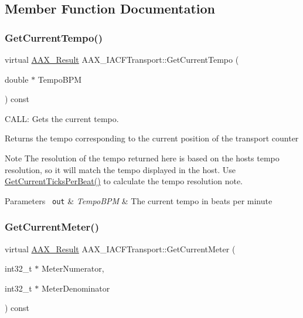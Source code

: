 \subsection{Member Function Documentation}
\mbox{\label{a01757_ac0818801e66a6840216ac3657d7abcf1}} 
\subsubsection{\texorpdfstring{GetCurrentTempo()}{GetCurrentTempo()}}
{\footnotesize\ttfamily virtual \mbox{\hyperlink{a00392_a4d8f69a697df7f70c3a8e9b8ee130d2f}{A\+A\+X\+\_\+\+Result}} A\+A\+X\+\_\+\+I\+A\+C\+F\+Transport\+::\+Get\+Current\+Tempo (\begin{DoxyParamCaption}\item[{double $\ast$}]{Tempo\+B\+PM }\end{DoxyParamCaption}) const\hspace{0.3cm}{\ttfamily [pure virtual]}}



C\+A\+LL\+: Gets the current tempo. 

Returns the tempo corresponding to the current position of the transport counter

\begin{DoxyNote}{Note}
The resolution of the tempo returned here is based on the host\textquotesingle{}s tempo resolution, so it will match the tempo displayed in the host. Use \mbox{\hyperlink{a01885_aa5cfd6fef3e4950583ec1e050be692ec}{Get\+Current\+Ticks\+Per\+Beat()}} to calculate the tempo resolution note.
\end{DoxyNote}

\begin{DoxyParams}[1]{Parameters}
\mbox{\texttt{ out}}  & {\em Tempo\+B\+PM} & The current tempo in beats per minute \\
\hline
\end{DoxyParams}
\mbox{\label{a01757_a8728c5cab60582e4a143f665a683ee7c}} 
\subsubsection{\texorpdfstring{GetCurrentMeter()}{GetCurrentMeter()}}
{\footnotesize\ttfamily virtual \mbox{\hyperlink{a00392_a4d8f69a697df7f70c3a8e9b8ee130d2f}{A\+A\+X\+\_\+\+Result}} A\+A\+X\+\_\+\+I\+A\+C\+F\+Transport\+::\+Get\+Current\+Meter (\begin{DoxyParamCaption}\item[{int32\+\_\+t $\ast$}]{Meter\+Numerator,  }\item[{int32\+\_\+t $\ast$}]{Meter\+Denominator }\end{DoxyParamCaption}) const\hspace{0.3cm}{\ttfamily [pure virtual]}}



